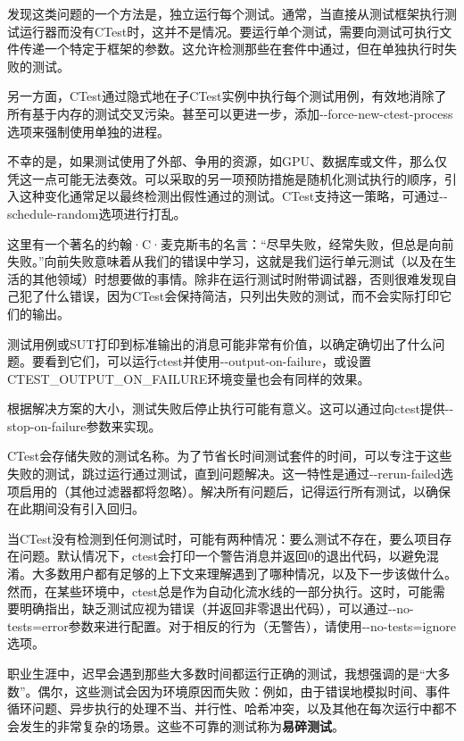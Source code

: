 发现这类问题的一个方法是，独立运行每个测试。通常，当直接从测试框架执行测试运行器而没有CTest时，这并不是情况。要运行单个测试，需要向测试可执行文件传递一个特定于框架的参数。这允许检测那些在套件中通过，但在单独执行时失败的测试。

另一方面，CTest通过隐式地在子CTest实例中执行每个测试用例，有效地消除了所有基于内存的测试交叉污染。甚至可以更进一步，添加-{}-force-new-ctest-process选项来强制使用单独的进程。

不幸的是，如果测试使用了外部、争用的资源，如GPU、数据库或文件，那么仅凭这一点可能无法奏效。可以采取的另一项预防措施是随机化测试执行的顺序，引入这种变化通常足以最终检测出假性通过的测试。CTest支持这一策略，可通过-{}-schedule-random选项进行打乱。


这里有一个著名的约翰·C·麦克斯韦的名言：“尽早失败，经常失败，但总是向前失败。”向前失败意味着从我们的错误中学习，这就是我们运行单元测试（以及在生活的其他领域）时想要做的事情。除非在运行测试时附带调试器，否则很难发现自己犯了什么错误，因为CTest会保持简洁，只列出失败的测试，而不会实际打印它们的输出。

测试用例或SUT打印到标准输出的消息可能非常有价值，以确定确切出了什么问题。要看到它们，可以运行ctest并使用-{}-output-on-failure，或设置CTEST\_OUTPUT\_ON\_FAILURE环境变量也会有同样的效果。

根据解决方案的大小，测试失败后停止执行可能有意义。这可以通过向ctest提供-{}-stop-on-failure参数来实现。

CTest会存储失败的测试名称。为了节省长时间测试套件的时间，可以专注于这些失败的测试，跳过运行通过测试，直到问题解决。这一特性是通过-{}-rerun-failed选项启用的（其他过滤器都将忽略）。解决所有问题后，记得运行所有测试，以确保在此期间没有引入回归。

当CTest没有检测到任何测试时，可能有两种情况：要么测试不存在，要么项目存在问题。默认情况下，ctest会打印一个警告消息并返回0的退出代码，以避免混淆。大多数用户都有足够的上下文来理解遇到了哪种情况，以及下一步该做什么。然而，在某些环境中，ctest总是作为自动化流水线的一部分执行。这时，可能需要明确指出，缺乏测试应视为错误（并返回非零退出代码），可以通过-{}-no-tests=error参数来进行配置。对于相反的行为（无警告），请使用-{}-no-tests=ignore选项。


职业生涯中，迟早会遇到那些大多数时间都运行正确的测试，我想强调的是“大多数”。偶尔，这些测试会因为环境原因而失败：例如，由于错误地模拟时间、事件循环问题、异步执行的处理不当、并行性、哈希冲突，以及其他在每次运行中都不会发生的非常复杂的场景。这些不可靠的测试称为\textbf{易碎测试}。

